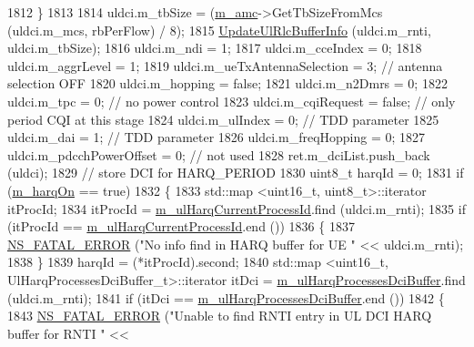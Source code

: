 \begin{DoxyCode}
1812         \}
1813 
1814       uldci.m\_tbSize = (\hyperlink{classns3_1_1TdTbfqFfMacScheduler_a42e469f5ce9e3e079123f5c9a60fe7c4}{m\_amc}->GetTbSizeFromMcs (uldci.m\_mcs, rbPerFlow) / 8);
1815       \hyperlink{classns3_1_1TdTbfqFfMacScheduler_a2caa7b733fe0f6d0c4739cd7b6dba645}{UpdateUlRlcBufferInfo} (uldci.m\_rnti, uldci.m\_tbSize);
1816       uldci.m\_ndi = 1;
1817       uldci.m\_cceIndex = 0;
1818       uldci.m\_aggrLevel = 1;
1819       uldci.m\_ueTxAntennaSelection = 3; \textcolor{comment}{// antenna selection OFF}
1820       uldci.m\_hopping = \textcolor{keyword}{false};
1821       uldci.m\_n2Dmrs = 0;
1822       uldci.m\_tpc = 0; \textcolor{comment}{// no power control}
1823       uldci.m\_cqiRequest = \textcolor{keyword}{false}; \textcolor{comment}{// only period CQI at this stage}
1824       uldci.m\_ulIndex = 0; \textcolor{comment}{// TDD parameter}
1825       uldci.m\_dai = 1; \textcolor{comment}{// TDD parameter}
1826       uldci.m\_freqHopping = 0;
1827       uldci.m\_pdcchPowerOffset = 0; \textcolor{comment}{// not used}
1828       ret.m\_dciList.push\_back (uldci);
1829       \textcolor{comment}{// store DCI for HARQ\_PERIOD}
1830       uint8\_t harqId = 0;
1831       \textcolor{keywordflow}{if} (\hyperlink{classns3_1_1TdTbfqFfMacScheduler_afbd88f1e039b365dcdbb076e99ce5506}{m\_harqOn} == \textcolor{keyword}{true})
1832         \{
1833           std::map <uint16\_t, uint8\_t>::iterator itProcId;
1834           itProcId = \hyperlink{classns3_1_1TdTbfqFfMacScheduler_a418d37c6f77b19886fe25e71c103e8b1}{m\_ulHarqCurrentProcessId}.find (uldci.m\_rnti);
1835           \textcolor{keywordflow}{if} (itProcId == \hyperlink{classns3_1_1TdTbfqFfMacScheduler_a418d37c6f77b19886fe25e71c103e8b1}{m\_ulHarqCurrentProcessId}.end ())
1836             \{
1837               \hyperlink{group__fatal_ga5131d5e3f75d7d4cbfd706ac456fdc85}{NS\_FATAL\_ERROR} (\textcolor{stringliteral}{"No info find in HARQ buffer for UE "} << uldci.m\_rnti);
1838             \}
1839           harqId = (*itProcId).second;
1840           std::map <uint16\_t, UlHarqProcessesDciBuffer\_t>::iterator itDci = 
      \hyperlink{classns3_1_1TdTbfqFfMacScheduler_aa7b74d7f5898ae380db92cdd1205efae}{m\_ulHarqProcessesDciBuffer}.find (uldci.m\_rnti);
1841           \textcolor{keywordflow}{if} (itDci == \hyperlink{classns3_1_1TdTbfqFfMacScheduler_aa7b74d7f5898ae380db92cdd1205efae}{m\_ulHarqProcessesDciBuffer}.end ())
1842             \{
1843               \hyperlink{group__fatal_ga5131d5e3f75d7d4cbfd706ac456fdc85}{NS\_FATAL\_ERROR} (\textcolor{stringliteral}{"Unable to find RNTI entry in UL DCI HARQ buffer for RNTI "} << 

\end{DoxyCode}
